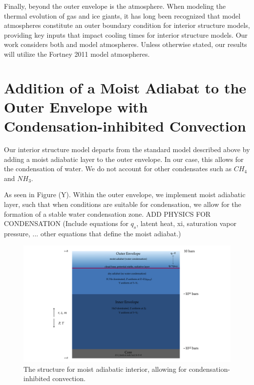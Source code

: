 \documentclass[11pt]{ucscthesisbs}
\begin{document}
Finally, beyond the outer envelope is the atmosphere. When modeling the thermal evolution of gas and ice giants, it has long been recognized that model atmospheres constitute an outer boundary condition for interior structure models, providing key inputs that impact cooling times for interior structure models. Our work considers both \citep{graboske_1975} and \citep{fortney_2011} model atmospheres. Unless otherwise stated, our results will utilize the Fortney 2011 model atmospheres. 


\section{Addition of a Moist Adiabat to the Outer Envelope with Condensation-inhibited Convection}
Our interior structure model departs from the standard model described above by adding a moist adiabatic layer to the outer envelope. In our case, this allows for the condensation of water. We do not account for other condensates such as $CH_{4}$ and $NH_{3}$.

As seen in Figure (Y).   Within the outer envelope, we implement moist adiabatic layer, such that when conditions are suitable for condensation, we allow for the formation of a stable water condensation zone. ADD PHYSICS FOR CONDENSATION (Include equations for $q_{s}$, latent heat, xi, saturation vapor pressure, ... other equations that define the moist adiabat.)

\begin{figure}[ht!]
 \centerline{
  \includegraphics[width=8.0in]{figures/moist_adiabat_structure.png}
 }
\caption[Interior Structure for Moist Adiabat]
{The structure for moist adiabatic interior, allowing for condensation-inhibited convection.}
\label{fig:moist_interior}
\end{figure}
\end{document}
